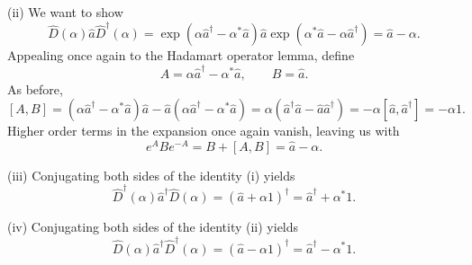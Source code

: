 \documentclass[11pt, letterpaper]{article}
\begin{document}
(ii) We want to show
\[
	\hat{D}(\alpha )\hat{a} \hat{D} ^\dagger(\alpha )= \exp \left( \alpha \hat{a} ^\dagger - \alpha ^* \hat{a}  \right) \hat{a} \exp \left( \alpha ^* \hat{a} -\alpha \hat{a} ^\dagger \right) = \hat{a} -\alpha 
.\]
Appealing once again to the Hadamart operator lemma, define
\[
	A=\alpha \hat{a} ^\dagger - \alpha ^* \hat{a} ,\qquad B=\hat{a} 
.\]
As before,
\[
	[A,B]=\left( \alpha \hat{a} ^\dagger - \alpha ^* \hat{a}  \right) \hat{a} - \hat{a} \left( \alpha \hat{a} ^\dagger - \alpha ^* \hat{a}  \right) =\alpha \left( \hat{a} ^\dagger \hat{a} -\hat{a}  \hat{a} ^\dagger \right) =-\alpha [\hat{a} ,\hat{a} ^\dagger]=-\alpha 1
.\]
Higher order terms in the expansion once again vanish, leaving us with
\[
	e^ABe^{-A} =B + [A,B] = \hat{a} -\alpha 
.\]


(iii) Conjugating both sides of the identity (i) yields
\[
	\hat{D}^\dagger (\alpha )\hat{a} ^\dagger \hat{D} (\alpha ) = \left( \hat{a} +\alpha 1 \right) ^\dagger = \hat{a} ^\dagger + \alpha ^* 1
.\]

(iv) Conjugating both sides of the identity (ii) yields
\[
	\hat{D} (\alpha )\hat{a} ^\dagger \hat{D} ^\dagger(\alpha )=\left( \hat{a} -\alpha 1 \right) ^\dagger = \hat{a} ^\dagger-\alpha ^*1
.\]
\end{document}
